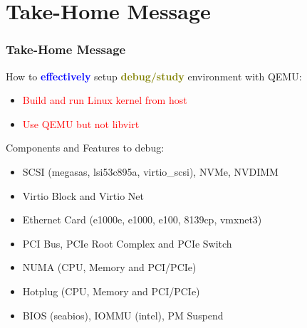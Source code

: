 \documentclass[aspectratio=169]{beamer}
\begin{document}

\section{Take-Home Message}
\begin{frame}
\frametitle{Take-Home Message}
{\Large How to \textbf{\textcolor{blue}{effectively}} setup \textbf{\textcolor{olive}{debug/study}} environment with QEMU:}
\begin{itemize}
\item {\Large \textcolor{red}{Build and run Linux kernel from host}}
\item {\Large \textcolor{red}{Use QEMU but not libvirt}}
\end{itemize}

\vspace{4 mm}

{\Large Components and Features to debug:}
\begin{itemize}
\item SCSI (megasas, lsi53c895a, virtio\_scsi), NVMe, NVDIMM
\item Virtio Block and Virtio Net
\item Ethernet Card (e1000e, e1000, e100, 8139cp, vmxnet3)
\item PCI Bus, PCIe Root Complex and PCIe Switch
\item NUMA (CPU, Memory and PCI/PCIe)
\item Hotplug (CPU, Memory and PCI/PCIe)
\item BIOS (seabios), IOMMU (intel), PM Suspend
\end{itemize}
\end{frame}

\end{document}
